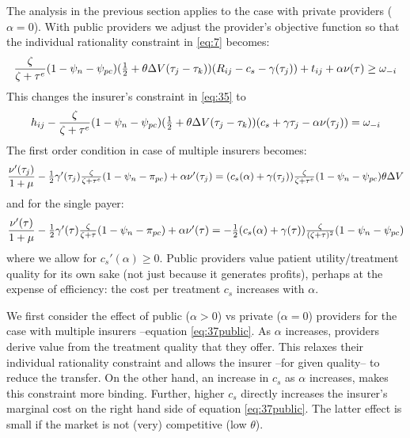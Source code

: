 \documentclass[12pt,english,a4paper]{article}
\begin{document}
The analysis in the previous section applies to the case with private providers (\(\alpha=0\)). With public providers we adjust the provider's objective function so that the individual rationality constraint in \eqref{eq:7} becomes:
\begin{equation}
\label{eq:7a}
\frac{\zeta}{\zeta+\tau^e}(1-\psi_n-\psi_{pc})( \textstyle{1\over 2} + \theta \Delta V (\tau_j - \tau_k))(R_{ij}-c_s-\gamma(\tau_j) ) + t_{ij} + \alpha \nu(\tau) \geq \omega_{-i}
\end{equation}
This changes the insurer's constraint in \eqref{eq:35} to
\begin{equation}
\label{eq:35public}
h_{ij}-\frac{\zeta}{\zeta+\tau^e}(1-\psi_n-\psi_{pc}) (\textstyle{1\over 2}+ \theta \Delta V (\tau_j - \tau_k)) (c_s+\gamma \tau_j-\alpha \nu(\tau_j)) = \omega_{-i}
\end{equation}
The first order condition in case of multiple insurers becomes:
\begin{equation}
\label{eq:37public} 
\frac{\nu'(\tau_j)}{1+\mu} - \textstyle{1\over 2} \gamma'(\tau_j) \frac{\zeta}{\zeta+\tau^e}(1-\psi_n-\pi_{pc}) + \alpha \nu'(\tau_j) = (c_s(\alpha)+\gamma(\tau_j)) \frac{\zeta}{\zeta+\tau^e} (1-\psi_n -\psi_{pc})\theta \Delta V 
\end{equation}
and for the single payer:
\begin{equation}
\label{eq:37SPpublic}
 \frac{\nu'(\tau)}{1+\mu} - \textstyle{1\over 2} \gamma'(\tau) \frac{\zeta}{\zeta+\tau}(1-\psi_n-\pi_{pc}) + \alpha \nu'(\tau) = - \textstyle{1\over 2}(c_s(\alpha)+\gamma( \tau)) \frac{\zeta}{(\zeta+\tau)^2} (1-\psi_n -\psi_{pc})
\end{equation}
where we allow for \(c_s'(\alpha) \geq 0\). Public providers value patient utility/treatment quality for its own sake (not just because it generates profits), perhaps at the expense of efficiency: the cost per treatment \(c_s\) increases with \(\alpha\).

We first consider the effect of public (\(\alpha>0\)) vs private (\(\alpha=0\)) providers for the case with multiple insurers --equation \eqref{eq:37public}. As \(\alpha\) increases, providers derive value from the treatment quality that they offer. This relaxes their individual rationality constraint and allows the insurer --for given quality-- to reduce the transfer. On the other hand, an increase in \(c_s\) as \(\alpha\) increases, makes this constraint more binding. Further, higher \(c_s\) directly increases the insurer's marginal cost on the right hand side of equation \eqref{eq:37public}. The latter effect is small if the market is not (very) competitive (low \(\theta\)).
\end{document}
